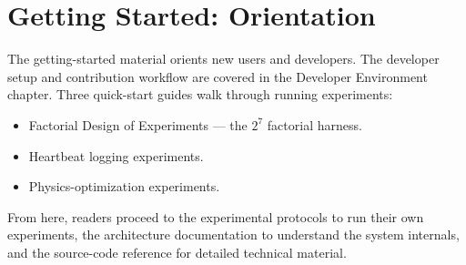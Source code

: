 
\section{Getting Started: Orientation}


The getting-started material orients new users and developers. The developer
setup and contribution workflow are covered in the Developer Environment
chapter. Three quick-start guides walk through running experiments:

\begin{itemize}
  \item Factorial Design of Experiments --- the $2^7$ factorial harness.
  \item Heartbeat logging experiments.
  \item Physics-optimization experiments.
\end{itemize}

From here, readers proceed to the experimental protocols to run their own
experiments, the architecture documentation to understand the system
internals, and the source-code reference for detailed technical material.

